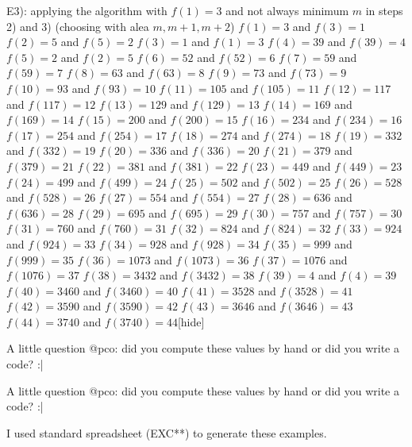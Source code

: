 \begin{solution}
\begin{tcolorbox}
E3): applying the algorithm with $f(1)=3$ and not always minimum $m$ in steps 2) and 3) (choosing with alea $m,m+1,m+2$)
$f(1)=3$ and $f(3)=1$
$f(2)=5$ and $f(5)=2$
$f(3)=1$ and $f(1)=3$
$f(4)=39$ and $f(39)=4$
$f(5)=2$ and $f(2)=5$
$f(6)=52$ and $f(52)=6$
$f(7)=59$ and $f(59)=7$
$f(8)=63$ and $f(63)=8$
$f(9)=73$ and $f(73)=9$
$f(10)=93$ and $f(93)=10$
$f(11)=105$ and $f(105)=11$
$f(12)=117$ and $f(117)=12$
$f(13)=129$ and $f(129)=13$
$f(14)=169$ and $f(169)=14$
$f(15)=200$ and $f(200)=15$
$f(16)=234$ and $f(234)=16$
$f(17)=254$ and $f(254)=17$
$f(18)=274$ and $f(274)=18$
$f(19)=332$ and $f(332)=19$
$f(20)=336$ and $f(336)=20$
$f(21)=379$ and $f(379)=21$
$f(22)=381$ and $f(381)=22$
$f(23)=449$ and $f(449)=23$
$f(24)=499$ and $f(499)=24$
$f(25)=502$ and $f(502)=25$
$f(26)=528$ and $f(528)=26$
$f(27)=554$ and $f(554)=27$
$f(28)=636$ and $f(636)=28$
$f(29)=695$ and $f(695)=29$
$f(30)=757$ and $f(757)=30$
$f(31)=760$ and $f(760)=31$
$f(32)=824$ and $f(824)=32$
$f(33)=924$ and $f(924)=33$
$f(34)=928$ and $f(928)=34$
$f(35)=999$ and $f(999)=35$
$f(36)=1073$ and $f(1073)=36$
$f(37)=1076$ and $f(1076)=37$
$f(38)=3432$ and $f(3432)=38$
$f(39)=4$ and $f(4)=39$
$f(40)=3460$ and $f(3460)=40$
$f(41)=3528$ and $f(3528)=41$
$f(42)=3590$ and $f(3590)=42$
$f(43)=3646$ and $f(3646)=43$
$f(44)=3740$ and $f(3740)=44$[\/hide]
\end{tcolorbox}

A little question @pco: did you compute these values by hand or did you write a code? :|
\end{solution}



\begin{solution}
	\begin{tcolorbox}A little question @pco: did you compute these values by hand or did you write a code? :|\end{tcolorbox}
I used standard spreadsheet (EXC**) to generate these examples.
\end{solution}




